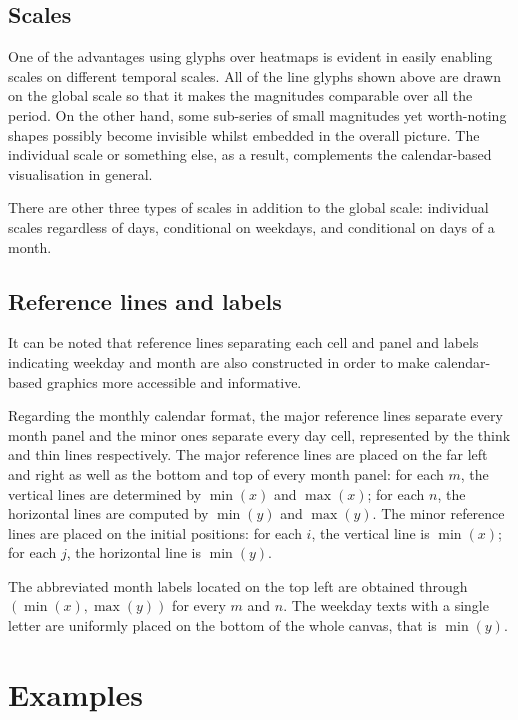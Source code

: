 \documentclass[article]{jss}
\begin{document}
\subsection{Scales}\label{scales}

One of the advantages using glyphs over heatmaps is evident in easily
enabling scales on different temporal scales. All of the line glyphs
shown above are drawn on the global scale so that it makes the
magnitudes comparable over all the period. On the other hand, some
sub-series of small magnitudes yet worth-noting shapes possibly become
invisible whilst embedded in the overall picture. The individual scale
or something else, as a result, complements the calendar-based
visualisation in general.

There are other three types of scales in addition to the global scale:
individual scales regardless of days, conditional on weekdays, and
conditional on days of a month.

\subsection{Reference lines and
labels}\label{reference-lines-and-labels}

It can be noted that reference lines separating each cell and panel and
labels indicating weekday and month are also constructed in order to
make calendar-based graphics more accessible and informative.

Regarding the monthly calendar format, the major reference lines
separate every month panel and the minor ones separate every day cell,
represented by the think and thin lines respectively. The major
reference lines are placed on the far left and right as well as the
bottom and top of every month panel: for each \(m\), the vertical lines
are determined by \(\min{(x)}\) and \(\max{(x)}\); for each \(n\), the
horizontal lines are computed by \(\min{(y)}\) and \(\max{(y)}\). The
minor reference lines are placed on the initial positions: for each
\(i\), the vertical line is \(\min{(x)}\); for each \(j\), the
horizontal line is \(\min{(y)}\).

The abbreviated month labels located on the top left are obtained
through \((\min{(x)}, \max{(y)})\) for every \(m\) and \(n\). The
weekday texts with a single letter are uniformly placed on the bottom of
the whole canvas, that is \(\min{(y)}\).

\section{Examples}\label{examples}
\end{document}
